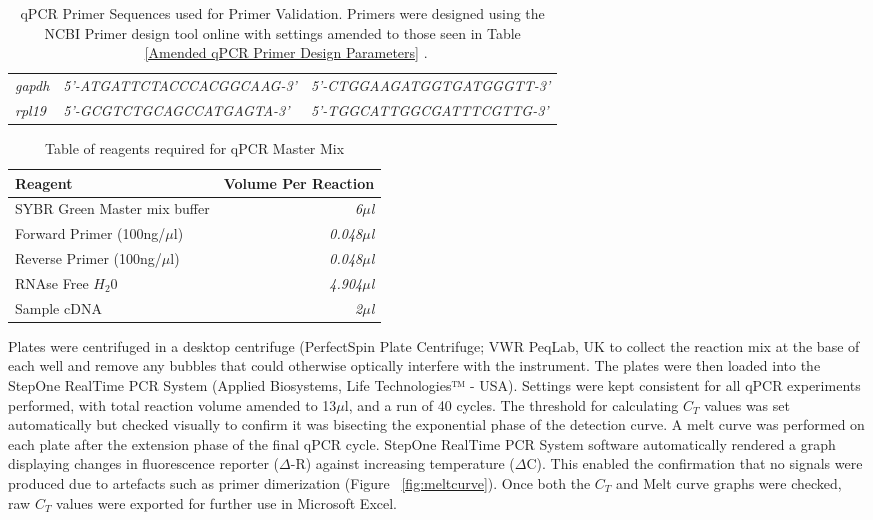 \begin{table}[!hbtp]
\begin{tabular}{p{1.5cm}|p{5cm}|p{5cm}}
\small{\textit{gapdh}} & {\textit{5’-ATGATTCTACCCACGGCAAG-3’}} & {\textit{5’-CTGGAAGATGGTGATGGGTT-3’}} \\
\small{\textit{rpl19}} & {\textit{5’-GCGTCTGCAGCCATGAGTA-3’}} & {\textit{5’-TGGCATTGGCGATTTCGTTG-3’}} \\
\end{tabular}
\caption[qPCR Primer Sequences for Primer Validation]{qPCR Primer Sequences used for Primer Validation. Primers were designed using the NCBI Primer design tool online with settings amended to those seen in Table ~\ref{Amended qPCR Primer Design Parameters} \cite{Ye2012}.}
\label{qPCRPrimers}	
\end{table}



\begin{table}[!htbp]
\small
\centering
\begin{tabular}{l | r}
Reagent & Volume Per Reaction \\
\hline
SYBR Green Master mix buffer  & \textit{6$\mu$l} \\
Forward Primer (100ng/$\mu$l) & \textit{0.048$\mu$l} \\
Reverse Primer (100ng/$\mu$l) & \textit{0.048$\mu$l} \\
RNAse Free $H_{2}0$ &  \textit{4.904$\mu$l} \\
Sample cDNA &  \textit{2$\mu$l} \\
\end{tabular}
\caption[Table of reagents for qPCR Master Mix]{Table of reagents required for qPCR Master Mix}
\label{tab:qPCRMaster}	
\end{table}

Plates were centrifuged in a desktop centrifuge (PerfectSpin Plate Centrifuge; VWR PeqLab, UK to collect the reaction mix at the base of each well and remove any bubbles that could otherwise optically interfere with the instrument. The plates were then loaded into the StepOne RealTime PCR System (Applied Biosystems, Life Technologies™ - USA). Settings were kept consistent for all qPCR experiments performed, with total reaction volume amended to 13$\mu$l, and a run of 40 cycles. The threshold for calculating $C_{T}$ values was set automatically but checked visually to confirm it was bisecting the exponential phase of the detection curve. A melt curve was performed on each plate after the extension phase of the final  qPCR cycle. StepOne RealTime PCR System software automatically rendered a graph displaying changes in fluorescence reporter ($\Delta$-R) against increasing temperature ($\Delta$\degree C). This enabled the confirmation that no signals were produced due to artefacts such as primer dimerization (Figure ~\ref{fig:meltcurve}). Once both the $C_{T}$ and Melt curve graphs were checked, raw $C_{T}$ values were exported for further use in Microsoft Excel. \\

